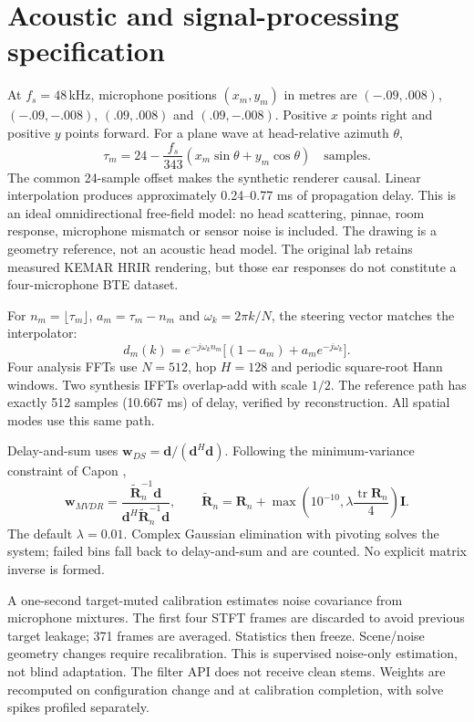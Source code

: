 \documentclass[11pt,a4paper]{article}
\begin{document}
\newpage
\section{Acoustic and signal-processing specification}
At $f_s=48\,$kHz, microphone positions $(x_m,y_m)$ in metres are $(-.09,.008)$, $(-.09,-.008)$, $(.09,.008)$ and $(.09,-.008)$. Positive $x$ points right and positive $y$ points forward. For a plane wave at head-relative azimuth $\theta$,
\begin{equation}
\tau_m=24-\frac{f_s}{343}(x_m\sin\theta+y_m\cos\theta)\quad\text{samples}.
\end{equation}
The common 24-sample offset makes the synthetic renderer causal. Linear interpolation produces approximately 0.24--0.77 ms of propagation delay. This is an ideal omnidirectional free-field model: no head scattering, pinnae, room response, microphone mismatch or sensor noise is included. The drawing is a geometry reference, not an acoustic head model. The original lab retains measured KEMAR HRIR rendering, but those ear responses do not constitute a four-microphone BTE dataset.

For $n_m=\lfloor\tau_m\rfloor$, $a_m=\tau_m-n_m$ and $\omega_k=2\pi k/N$, the steering vector matches the interpolator:
\begin{equation}
d_m(k)=e^{-j\omega_k n_m}\big[(1-a_m)+a_me^{-j\omega_k}\big].
\end{equation}
Four analysis FFTs use $N=512$, hop $H=128$ and periodic square-root Hann windows. Two synthesis IFFTs overlap-add with scale $1/2$. The reference path has exactly 512 samples (10.667 ms) of delay, verified by reconstruction. All spatial modes use this same path.

Delay-and-sum uses $\mathbf w_{DS}=\mathbf d/(\mathbf d^H\mathbf d)$. Following the minimum-variance constraint of Capon \cite{capon},
\begin{equation}
\mathbf w_{MVDR}=\frac{\widetilde{\mathbf R}_n^{-1}\mathbf d}{\mathbf d^H\widetilde{\mathbf R}_n^{-1}\mathbf d},\qquad
\widetilde{\mathbf R}_n=\mathbf R_n+\max\!\left(10^{-10},\lambda\frac{\operatorname{tr}\mathbf R_n}{4}\right)\mathbf I.
\end{equation}
The default $\lambda=0.01$. Complex Gaussian elimination with pivoting solves the system; failed bins fall back to delay-and-sum and are counted. No explicit matrix inverse is formed.

A one-second target-muted calibration estimates noise covariance from microphone mixtures. The first four STFT frames are discarded to avoid previous target leakage; 371 frames are averaged. Statistics then freeze. Scene/noise geometry changes require recalibration. This is supervised noise-only estimation, not blind adaptation. The filter API does not receive clean stems. Weights are recomputed on configuration change and at calibration completion, with solve spikes profiled separately.
\end{document}
